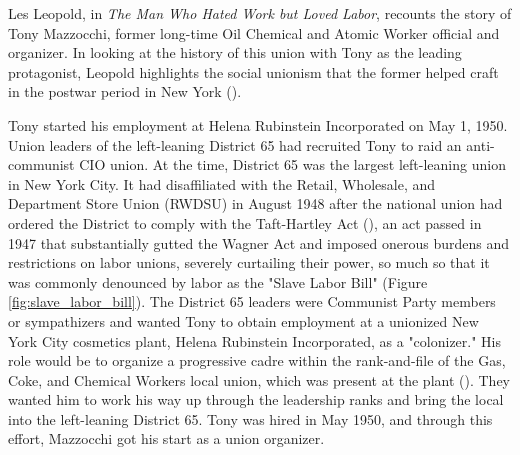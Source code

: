 \documentclass[12pt]{article}
\begin{document}
Les Leopold, in \textit{The Man Who Hated Work but Loved Labor}, recounts the story of Tony Mazzocchi, former long-time Oil Chemical and Atomic Worker official and organizer. In looking at the history of this union with Tony as the leading protagonist, Leopold highlights the social unionism that the former helped craft in the postwar period in New York (\cite[16]{leopoldManWhoHated2007}).

Tony started his employment at Helena Rubinstein Incorporated on May 1, 1950. Union leaders of the left-leaning District 65 had recruited Tony to raid an anti-communist CIO union. At the time, District 65 was the largest left-leaning union in New York City. It had disaffiliated with the Retail, Wholesale, and Department Store Union (RWDSU) in August 1948 after the national union had ordered the District to comply with the Taft-Hartley Act (\cite{leopoldManWhoHated2007}), an act passed in 1947 that substantially gutted the Wagner Act and imposed onerous burdens and restrictions on labor unions, severely curtailing their power, so much so that it was commonly denounced by labor as the "Slave Labor Bill" (Figure \ref{fig:slave_labor_bill}). The District 65 leaders were Communist Party members or sympathizers and wanted Tony to obtain employment at a unionized New York City cosmetics plant, Helena Rubinstein Incorporated, as a "colonizer." His role would be to organize a progressive cadre within the rank-and-file of the Gas, Coke, and Chemical Workers local union, which was present at the plant (\cite[71]{leopoldManWhoHated2007}). They wanted him to work his way up through the leadership ranks and bring the local into the left-leaning District 65. Tony was hired in May 1950, and through this effort, Mazzocchi got his start as a union organizer.
\end{document}
